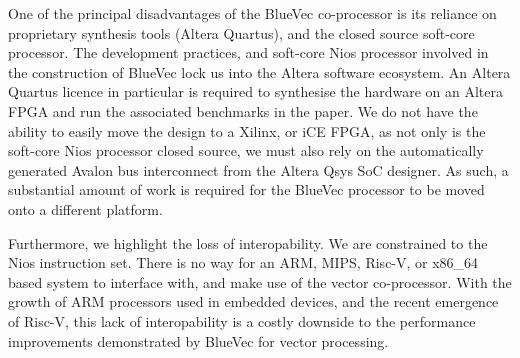 \documentclass[a4paper,8pt]{report}
\begin{document}
One of the principal disadvantages of the BlueVec co-processor is its reliance
on proprietary synthesis tools (Altera Quartus), and the closed source soft-core
processor. The development practices, and soft-core Nios processor involved in
the construction of BlueVec lock us into the Altera software ecosystem. An
Altera Quartus licence in particular is required to synthesise the hardware on
an Altera FPGA and run the associated benchmarks in the paper. We do not have
the ability to easily move the design to a Xilinx, or iCE FPGA, as not only is
the soft-core Nios processor closed source, we must also rely on the
automatically generated Avalon bus interconnect from the Altera Qsys SoC
designer. As such, a substantial amount of work is required for the BlueVec
processor to be moved onto a different platform.


Furthermore, we highlight the loss of interopability. We are constrained to the
Nios instruction set. There is no way for an ARM, MIPS, Risc-V, or x86\_64 based
system to interface with, and make use of the vector co-processor. With the
growth of ARM processors used in embedded devices, and the recent emergence of
Risc-V, this lack of interopability is a costly downside to the performance
improvements demonstrated by BlueVec for vector processing.





% 

\end{document}
